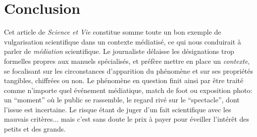 \documentclass[a4paper,10pt]{article}
\begin{document}
\section*{Conclusion}
Cet article de \textit{Science et Vie} constitue somme toute un bon exemple de vulgarisation scientifique dans un contexte médiatisé, ce qui nous conduirait à parler de \textit{médiation} scientifique. Le journaliste délaisse les désignations trop formelles propres aux manuels spécialisés, et préfère mettre en place un \textit{contexte}, se focalisant sur les circonstances d'apparition du phénomène et sur ses propriétés tangibles, chiffrées ou non. Le phénomène en question finit ainsi par être traité comme n'importe quel événement médiatique, match de foot ou exposition photo: un ``moment'' où le public se rassemble, le regard rivé sur le ``spectacle'', dont l'issue est incertaine. Le risque étant de juger d'un fait scientifique avec les mauvais critères... mais c'est sans doute le prix à payer pour éveiller l'intérêt des petits et des grands.






\medskip




\end{document}
